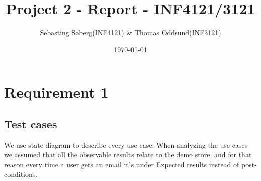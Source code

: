 \documentclass[UKenglish,12pt]{article}
\title{Project 2 - Report - INF4121/3121} %
\date{\today} %
\author{Sebasting Søberg(INF4121) \& Thomas Oddsund(INF3121)}
\begin{document}
\maketitle %

\section{Requirement 1}
\subsection{Test cases}
We use state diagram to describe every use-case. When analyzing the use cases we assumed that all the observable results relate to the demo store, and for that reason every time a user gets an email it's under Expected results instead of post-conditions.
\end{document}
